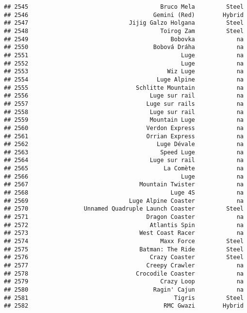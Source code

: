\documentclass[
]{article}
\begin{document}
\begin{verbatim}
## 2545                                      Bruco Mela         Steel
## 2546                                    Gemini (Red)        Hybrid
## 2547                             Jijig Galzo Holgana         Steel
## 2548                                      Toirog Zam         Steel
## 2549                                         Bobovka            na
## 2550                                    Bobová Dráha            na
## 2551                                            Luge            na
## 2552                                            Luge            na
## 2553                                        Wiz Luge            na
## 2554                                     Luge Alpine            na
## 2555                               Schlitte Mountain            na
## 2556                                   Luge sur rail            na
## 2557                                  Luge sur rails            na
## 2558                                   Luge sur rail            na
## 2559                                   Mountain Luge            na
## 2560                                  Verdon Express            na
## 2561                                  Orrian Express            na
## 2562                                     Luge Dévale            na
## 2563                                      Speed Luge            na
## 2564                                   Luge sur rail            na
## 2565                                       La Comète            na
## 2566                                            Luge            na
## 2567                                Mountain Twister            na
## 2568                                         Luge 4S            na
## 2569                             Luge Alpine Coaster            na
## 2570                Unnamed Quadruple Launch Coaster         Steel
## 2571                                  Dragon Coaster            na
## 2572                                   Atlantis Spin            na
## 2573                                West Coast Racer            na
## 2574                                      Maxx Force         Steel
## 2575                                Batman: The Ride         Steel
## 2576                                   Crazy Coaster         Steel
## 2577                                  Creepy Crawler            na
## 2578                               Crocodile Coaster            na
## 2579                                      Crazy Loop            na
## 2580                                    Ragin' Cajun            na
## 2581                                          Tigris         Steel
## 2582                                       RMC Gwazi        Hybrid

\end{verbatim}
\end{document}

